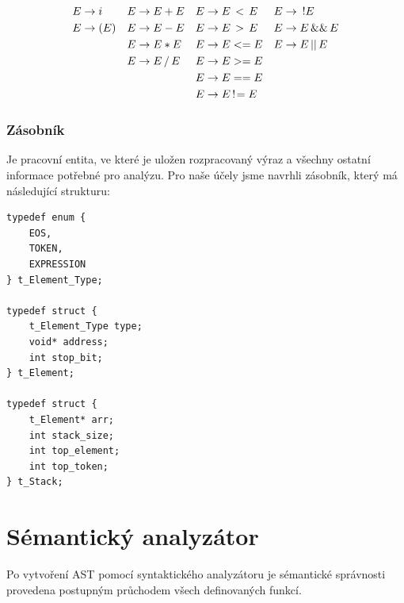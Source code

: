 \documentclass[a4paper,11pt]{article}
\begin{document}
\begin{align*}
E &\rightarrow i      &  E &\rightarrow E + E                      &  E &\rightarrow E \thinspace<\thinspace E    &  E &\rightarrow \enspace !E    \\
E &\rightarrow ( E )  &  E &\rightarrow E - E                      &  E &\rightarrow E \thinspace>\thinspace E    &  E &\rightarrow E \thinspace \&\& \thinspace E\\
  &                   &  E &\rightarrow E * E                      &  E &\rightarrow E <= E                       &  E &\rightarrow E \thinspace || \thinspace E\\
  &                   &  E &\rightarrow E\thinspace/\thinspace E   &  E &\rightarrow E >= E                       &    &                 \\
  &                   &    &                                       &  E &\rightarrow E == E                       &    &                 \\
  &                   &    &                                       &  E &\rightarrow E\thinspace!\!= E            &    &                 \\
\end{align*}

\subsubsection{Zásobník}
Je pracovní entita, ve které je uložen rozpracovaný výraz a všechny ostatní informace potřebné pro analýzu. Pro naše účely jsme navrhli zásobník, který má následující strukturu:

\begin{lstlisting}[caption={Výstupní struktura SA}, label={lst:saOut}]
typedef enum {
    EOS,
    TOKEN,
    EXPRESSION
} t_Element_Type;

typedef struct {
    t_Element_Type type;
    void* address;
    int stop_bit;
} t_Element;

typedef struct {
    t_Element* arr;
    int stack_size;
    int top_element;
    int top_token;
} t_Stack;

\end{lstlisting}

\section{Sémantický analyzátor}
Po vytvoření AST pomocí syntaktického analyzátoru je sémantické správnosti provedena postupným průchodem všech definovaných funkcí.
\end{document}
